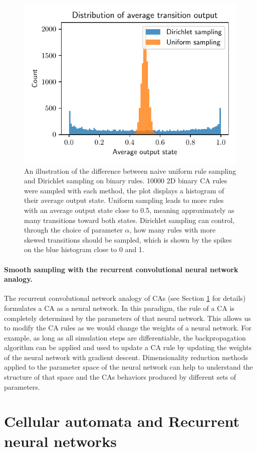 \begin{figure}[htbp]
  \centering
  \includegraphics[width=.5\linewidth]{figures/ca_rule_sampling_hist}
  \caption{An illustration of the difference between naive uniform rule sampling
    and Dirichlet sampling on binary rules. 10000 2D binary CA rules were
    sampled with each method, the plot displays a histogram of their average
    output state. Uniform sampling leads to more rules with an average output
    state close to 0.5, meaning approximately as many transitions toward both
    states. Dirichlet sampling can control, through the choice of parameter $\alpha$,
    how many rules with more skewed transitions should be sampled, which is
   shown by the spikes on the blue histogram close to 0 and 1.}
  \label{fig:ca_rule_sampling}
\end{figure}

\paragraph{Smooth sampling with the recurrent convolutional neural network
  analogy.}

The recurrent convolutional network analogy of \acp{CA} (see Section
\ref{sec:cell-autom-rnns} for details) formulates a \ac{CA} as a neural network.
In this paradigm, the rule of a \ac{CA} is completely determined by the parameters
of that neural network. This allows us to modify the \ac{CA} rules as we would
change the weights of a neural network. For example, as long as all simulation
steps are differentiable, the backpropagation algorithm can be applied and used
to update a \ac{CA} rule by updating the weights of the neural network with
gradient descent. Dimensionality reduction methods applied to the parameter
space of the neural network can help to understand the structure of that space and
the \acp{CA} behaviors produced by different sets of parameters.


\section{Cellular automata and Recurrent neural networks}\label{sec:cell-autom-rnns}

